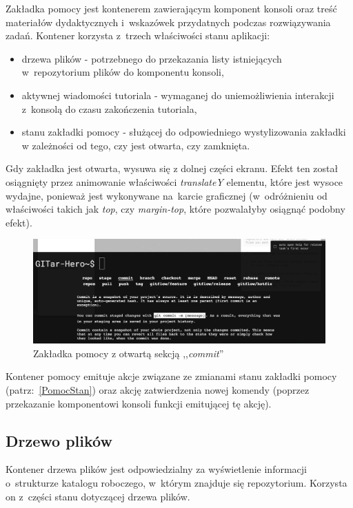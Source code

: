 \documentclass[12pt,a4paper,polish,thesis]{dcsbook}
\begin{document}
{	Zakładka pomocy jest kontenerem zawierającym komponent konsoli oraz treść materiałów dydaktycznych i~wskazówek przydatnych podczas rozwiązywania zadań. Kontener korzysta z~trzech właściwości stanu aplikacji:
	\begin{itemize}
		\item drzewa plików - potrzebnego do przekazania listy istniejących w~repozytorium plików do komponentu konsoli,
		\item aktywnej wiadomości tutoriala - wymaganej do uniemożliwienia interakcji z~konsolą do czasu zakończenia tutoriala,
		\item stanu zakładki pomocy - służącej do odpowiedniego wystylizowania zakładki w zależności od tego, czy jest otwarta, czy zamknięta.
	\end{itemize}
	  Gdy zakładka jest otwarta, wysuwa się z dolnej części ekranu. Efekt ten został osiągnięty przez animowanie właściwości \textit{translateY} elementu, które jest wysoce wydajne, ponieważ jest wykonywane na~karcie graficznej (w~odróżnieniu od właściwości takich jak \textit{top}, czy \textit{margin-top}, które pozwalałyby osiągnąć podobny efekt). 

	  \begin{figure}[h]
	  	\centering
	  	\includegraphics[width=15cm]{component-help-drawer}
	  	\caption{Zakładka pomocy z otwartą sekcją ,,\textit{commit}''}
	  	\label{fig:help-drawer}
	  \end{figure}

	  Kontener pomocy emituje akcje związane ze zmianami stanu zakładki pomocy (patrz:~\ref{PomocStan}) oraz akcję zatwierdzenia nowej komendy (poprzez przekazanie komponentowi konsoli funkcji emitującej tę akcję).

	\subsection{Drzewo plików}

	Kontener drzewa plików jest odpowiedzialny za wyświetlenie informacji o~strukturze katalogu roboczego, w~którym znajduje się repozytorium. Korzysta on z~części stanu dotyczącej drzewa plików.

}
\end{document}
